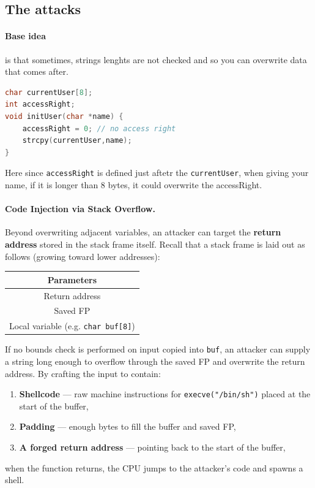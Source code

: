 \subsection{The attacks}

\paragraph{Base idea} is that sometimes, strings lenghts are not checked and so you can overwrite data that comes after.

\begin{lstlisting}[language=C]
char currentUser[8];
int accessRight;
void initUser(char *name) {
    accessRight = 0; // no access right
    strcpy(currentUser,name);
}

\end{lstlisting}
Here since \texttt{accessRight} is defined just aftetr the \texttt{currentUser}, when giving your name, if it is longer than 8 bytes, it could overwrite the accessRight.

\paragraph{Code Injection via Stack Overflow.}
Beyond overwriting adjacent variables, an attacker can target the \textbf{return address} stored in the stack frame itself. Recall that a stack frame is laid out as follows (growing toward lower addresses):

\begin{center}
\begin{tabular}{|c|}
\hline
Parameters \\
\hline
Return address \\
\hline
Saved FP \\
\hline
Local variable (e.g. \texttt{char buf[8]}) \\
\hline
\end{tabular}
\end{center}

If no bounds check is performed on input copied into \texttt{buf}, an attacker can supply a string long enough to overflow through the saved FP and overwrite the return address. By crafting the input to contain:
\begin{enumerate}
    \item \textbf{Shellcode} — raw machine instructions for \texttt{execve("/bin/sh")} placed at the start of the buffer,
    \item \textbf{Padding} — enough bytes to fill the buffer and saved FP,
    \item \textbf{A forged return address} — pointing back to the start of the buffer,
\end{enumerate}
when the function returns, the CPU jumps to the attacker's code and spawns a shell.

